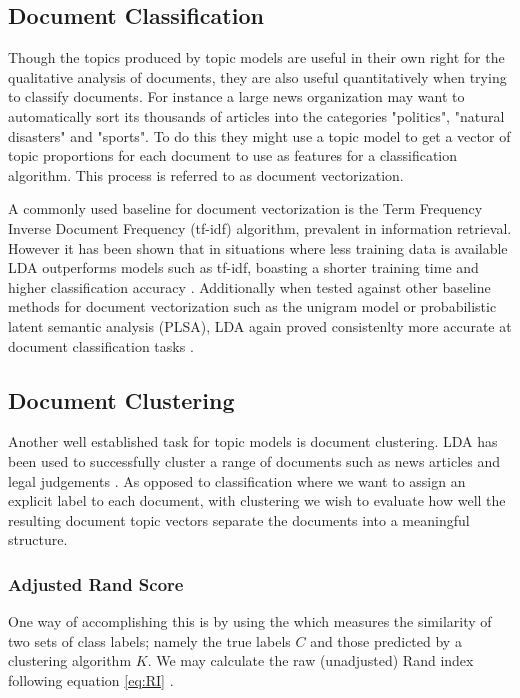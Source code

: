 \subsection{Document Classification}
Though the topics produced by topic models are useful in their own right for the qualitative analysis of documents, they are also useful quantitatively when trying to classify documents. For instance a large news organization may want to automatically sort its thousands of articles into the categories "politics", "natural disasters" and "sports". To do this they might use a topic model to get a vector of topic proportions for each document to use as features for a classification algorithm. This process is referred to as document vectorization.

A commonly used baseline for document vectorization is the Term Frequency Inverse Document Frequency (tf-idf) algorithm, prevalent in information retrieval. However it has been shown that in situations where less training data is available LDA outperforms models such as tf-idf, boasting a shorter training time and higher classification accuracy \parencite{liempirical}. Additionally when tested against other baseline methods for document vectorization such as the unigram model or probabilistic latent semantic analysis (PLSA), LDA again proved consistenlty more accurate at document classification tasks \parencite{Lu:2011:ITP:1969504.1969510}. 



\subsection{Document Clustering}
Another well established task for topic models is document clustering. LDA has been used to successfully cluster a range of documents such as news articles and legal judgements \parencite{Lu:2011:ITP:1969504.1969510, DBLP:journals/corr/XieX13, Kumar2013}. As opposed to classification where we want to assign an explicit label to each document, with clustering we wish to evaluate how well the resulting document topic vectors separate the documents into a meaningful structure.

\subsubsection{Adjusted Rand Score}
One way of accomplishing this is by using the  which measures the similarity of two sets of class labels; namely the true labels $C$ and those predicted by a clustering algorithm $K$. We may calculate the raw (unadjusted) Rand index following equation \ref{eq:RI} \parencite{Hubert1985}. 

